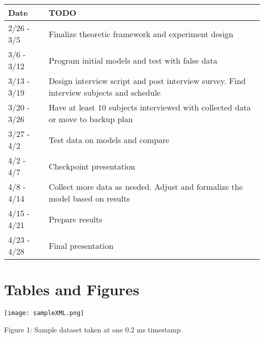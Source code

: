 \documentclass[12pt,letterpaper]{article}
\begin{document}
\begin{center}
\begin{tabular}{ l | p{8cm} }
\bf{Date} & \bf{TODO} \\ \hline
2/26 - 3/5 & Finalize theoretic framework and experiment design\\
3/6 - 3/12 & Program initial models and test with false data\\
3/13 - 3/19 & Design interview script and post interview survey. Find interview subjects and schedule\\
3/20 - 3/26 & Have at least 10 subjects interviewed with collected data or move to backup plan\\
3/27 - 4/2 & Test data on models and compare\\
4/2 - 4/7 & Checkpoint presentation\\
4/8 - 4/14 & Collect more data as needed. Adjust and formalize the model based on results\\
4/15 - 4/21 & Prepare results\\
4/23 - 4/28 & Final presentation
\end{tabular}
\end{center}

\section{Tables and Figures}
\texttt{[image: sampleXML.png]}
\begin{center} Figure 1: Sample dataset taken at one 0.2 ms timestamp \end{center}


\end{document}
